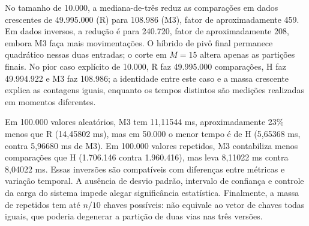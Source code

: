 No tamanho de 10.000, a mediana-de-três reduz as comparações em dados crescentes de 49.995.000 (R) para 108.986 (M3), fator de aproximadamente 459. Em dados inversos, a redução é para 240.720, fator de aproximadamente 208, embora M3 faça mais movimentações. O híbrido de pivô final permanece quadrático nessas duas entradas; o corte em $M=15$ altera apenas as partições finais. No pior caso explícito de 10.000, R faz 49.995.000 comparações, H faz 49.994.922 e M3 faz 108.986; a identidade entre este caso e a massa crescente explica as contagens iguais, enquanto os tempos distintos são medições realizadas em momentos diferentes.

Em 100.000 valores aleatórios, M3 tem 11,11544 ms, aproximadamente 23\% menos que R (14,45802 ms), mas em 50.000 o menor tempo é de H (5,65368 ms, contra 5,96680 ms de M3). Em 100.000 valores repetidos, M3 contabiliza menos comparações que H (1.706.146 contra 1.960.416), mas leva 8,11022 ms contra 8,04022 ms. Essas inversões são compatíveis com diferenças entre métricas e variação temporal. A ausência de desvio padrão, intervalo de confiança e controle da carga do sistema impede alegar significância estatística. Finalmente, a massa de repetidos tem até $n/10$ chaves possíveis: não equivale ao vetor de chaves todas iguais, que poderia degenerar a partição de duas vias nas três versões.
